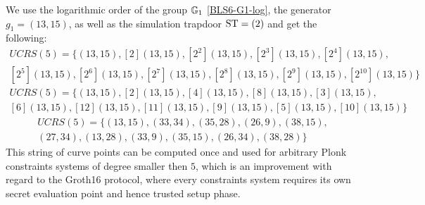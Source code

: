 \begin{example}
We use the logarithmic order of the group $\mathbb{G}_1$ \ref{BLS6-G1-log}, the generator $g_1=(13,15)$, as well as the simulation trapdoor $\mathrm{ST} =(2)$ and get the following:
\begin{multline*}
UCRS(5) =\{(13,15), [2](13,15), [2^2](13,15), [2^3](13,15), [2^4](13,15), \\
[2^5](13,15), [2^6](13,15), [2^7](13,15), [2^8](13,15), [2^9](13,15), [2^{10}](13,15)\}
\end{multline*}
\begin{multline*}
UCRS(5) =\{(13,15), [2](13,15), [4](13,15), [8](13,15), [3](13,15), \\
[6](13,15), [12](13,15), [11](13,15), [9](13,15), [5](13,15), [10](13,15)\}
\end{multline*}
\begin{multline*}
UCRS(5) =\{(13,15), (33,34), (35,28), (26,9), (38,15), \\
(27,34), (13,28), (33,9), (35,15), (26,34), (38,28)\}
\end{multline*}
This string of curve points can be computed once and used for arbitrary Plonk constraints systems of degree smaller then $5$, which is an improvement with regard to the Groth16 protocol, where every constraints system requires its own secret evaluation point and hence trusted setup phase.


\end{example}
